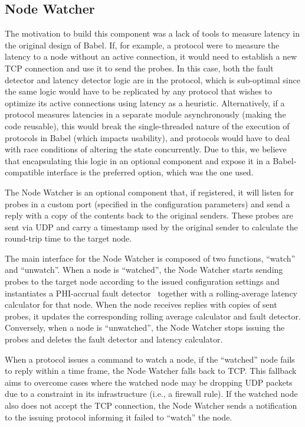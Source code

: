 \subsection{Node Watcher} \label{sec:Node-Watcher}

The motivation to build this component was a lack of tools to measure latency in the original design of Babel. If, for example, a protocol were to measure the latency to a node without an active connection, it would need to establish a new TCP connection and use it to send the probes. In this case, both the fault detector and latency detector logic are in the protocol, which is sub-optimal since the same logic would have to be replicated by any protocol that wishes to optimize its active connections using latency as a heuristic. Alternatively, if a protocol measures latencies in a separate module asynchronously (making the code reusable), this would break the single-threaded nature of the execution of protocols in Babel (which impacts usability), and protocols would have to deal with race conditions of altering the state concurrently. Due to this, we believe that encapsulating this logic in an optional component and expose it in a Babel-compatible interface is the preferred option, which was the one used.

The Node Watcher is an optional component that, if registered, it will listen for probes in a custom port (specified in the configuration parameters) and send a reply with a copy of the contents back to the original senders. These probes are sent via UDP and carry a timestamp used by the original sender to calculate the round-trip time to the target node.

The main interface for the Node Watcher is composed of two functions, ``watch'' and ``unwatch''. When a node is ``watched'', the Node Watcher starts sending probes to the target node according to the issued configuration settings and instantiates a PHI-accrual fault detector~\cite{phi-accrual-fd} together with a rolling-average latency calculator for that node.  When the node receives replies with copies of sent probes, it updates the corresponding rolling average calculator and fault detector. Conversely, when a node is ``unwatched'', the Node Watcher stops issuing the probes and deletes the fault detector and latency calculator.

When a protocol issues a command to watch a node, if the ``watched'' node fails to reply within a time frame, the Node Watcher falls back to TCP. This fallback aims to overcome cases where the watched node may be dropping UDP packets due to a constraint in its infrastructure (i.e., a firewall rule). If the watched node also does not accept the TCP connection, the Node Watcher sends a notification to the issuing protocol informing it failed to ``watch'' the node.

